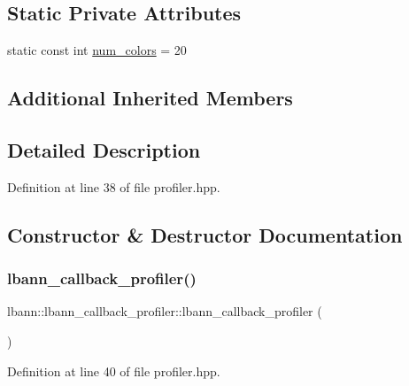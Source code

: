 \subsection*{Static Private Attributes}
\begin{DoxyCompactItemize}
\item 
static const int \hyperlink{classlbann_1_1lbann__callback__profiler_a48e38406712543f839dd7e5e840694e2}{num\+\_\+colors} = 20
\end{DoxyCompactItemize}
\subsection*{Additional Inherited Members}


\subsection{Detailed Description}


Definition at line 38 of file profiler.\+hpp.



\subsection{Constructor \& Destructor Documentation}
\mbox{\label{classlbann_1_1lbann__callback__profiler_aa1df0f5400362d0b4c469df5d4657eed}} 
\subsubsection{\texorpdfstring{lbann\+\_\+callback\+\_\+profiler()}{lbann\_callback\_profiler()}\hspace{0.1cm}{\footnotesize\ttfamily [1/2]}}
{\footnotesize\ttfamily lbann\+::lbann\+\_\+callback\+\_\+profiler\+::lbann\+\_\+callback\+\_\+profiler (\begin{DoxyParamCaption}{ }\end{DoxyParamCaption})\hspace{0.3cm}{\ttfamily [inline]}}



Definition at line 40 of file profiler.\+hpp.


